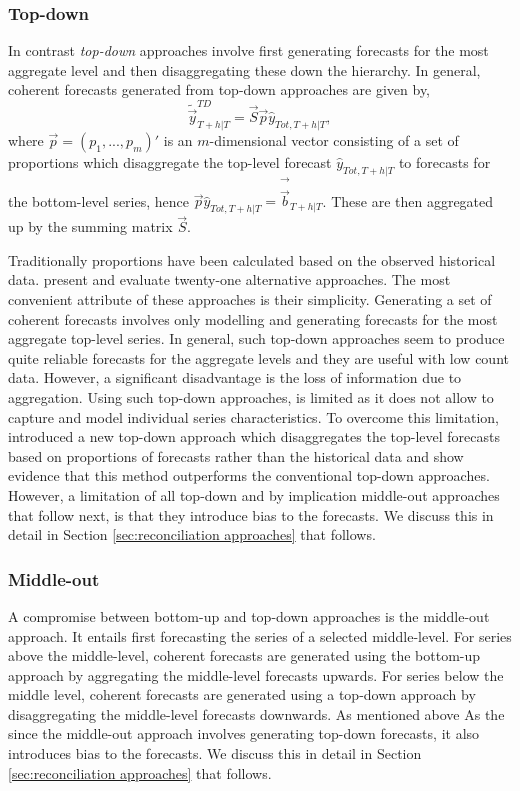 \documentclass[graybox]{svmult}
\begin{document}
\subsubsection{Top-down}

In contrast \textit{top-down} approaches involve first generating forecasts for the most aggregate level and then disaggregating these down the hierarchy. In general, coherent forecasts generated from top-down approaches are given by,
\begin{equation*}
\tilde{\vec{y}}^{TD}_{T+h|T}=\vec{S}\vec{p}\hat{y}_{Tot, T+h|T},
\end{equation*}
where $\vec{p} = (p_1,...,p_m)'$ is an $m$-dimensional vector consisting of a set of proportions which disaggregate the top-level forecast $\hat{y}_{Tot, T+h|T}$ to forecasts for the bottom-level series, hence $\vec{p}\hat{y}_{Tot, T+h|T}=\vec{\hat{\vec{b}}}_{T+h|T}$. These are then aggregated up by the summing matrix $\vec{S}$.

Traditionally proportions have been calculated based on the observed historical data. \cite{gross1990} present and evaluate twenty-one alternative approaches. The most convenient attribute of these approaches is their simplicity. Generating a set of coherent forecasts involves only modelling and generating forecasts for the most aggregate top-level series. In general, such top-down approaches seem to produce quite reliable forecasts for the aggregate levels and they are useful with low count data. However, a significant disadvantage is the loss of information due to aggregation. Using such top-down approaches, is limited as it does not allow to capture and model individual series characteristics. To overcome this limitation, \cite{AthEtAl2009} introduced a new top-down approach which disaggregates the top-level forecasts based on proportions of forecasts rather than the historical data and show evidence that this method outperforms the conventional top-down approaches. However, a limitation of all top-down and by implication middle-out approaches that follow next, is that they introduce bias to the forecasts. We discuss this in detail in Section \ref{sec:reconciliation approaches} that follows.

\subsubsection{Middle-out}

A compromise between bottom-up and top-down approaches is the middle-out approach. It entails first forecasting the series of a selected middle-level. For series above the middle-level, coherent forecasts are generated using the bottom-up approach by aggregating the middle-level forecasts upwards. For series below the middle level, coherent forecasts are generated using a top-down approach by disaggregating the middle-level forecasts downwards. As mentioned above As the since the middle-out approach involves generating top-down forecasts, it also introduces bias to the forecasts. We discuss this in detail in Section \ref{sec:reconciliation approaches} that follows.
\end{document}
